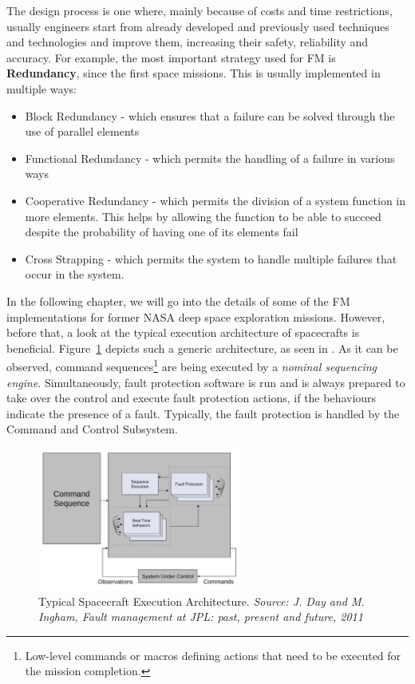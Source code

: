 The design process is one where, mainly because of costs and time restrictions,
usually engineers start from already developed and previously used techniques
and technologies and improve them, increasing their safety, reliability and
accuracy. For example, the most important strategy used for FM is
\textbf{Redundancy}, since the first space missions. This is usually implemented
in multiple ways\cite{surv-nasa-mars}:
\begin{itemize}
\item Block Redundancy - which ensures that a failure can be solved through the
use of parallel elements
\item Functional Redundancy - which permits the handling of a failure in various
ways
\item Cooperative Redundancy - which permits the division of a system function
in more elements. This helps by allowing the function to be able to succeed despite
the probability of having one of its elements fail
\item Cross Strapping - which permits the system to handle multiple failures
that occur in the system.
\end{itemize}

In the following chapter, we will go into the details of some of the FM
implementations for former NASA deep space exploration missions. However, before
that, a look at the typical execution architecture of spacecrafts is beneficial.
Figure~\ref{fig:spacecraft_execution_architecture} depicts such a generic
architecture, as seen in \cite{fm-jpl}. As it can be observed, command
sequences\footnote{Low-level commands or macros defining actions that need to be
executed for the mission completion.} are being executed by a \textit{nominal
sequencing engine}. Simultaneously, fault protection software is run and is
always prepared to take over the control and execute fault protection actions,
if the behaviours indicate the presence of a fault. Typically, the fault
protection is handled by the Command and Control Subsystem.

\begin{figure}[ht]
	\begin{center}
	\includegraphics[width=0.6\textwidth]{img/spacecraft_execution_architecture.pdf}
	\caption{Typical Spacecraft Execution Architecture. \small{\textit{Source: J.
	Day and M. Ingham, Fault management at JPL: past, present and future, 2011}}}
	\label{fig:spacecraft_execution_architecture}
	\end{center}
\end{figure}

